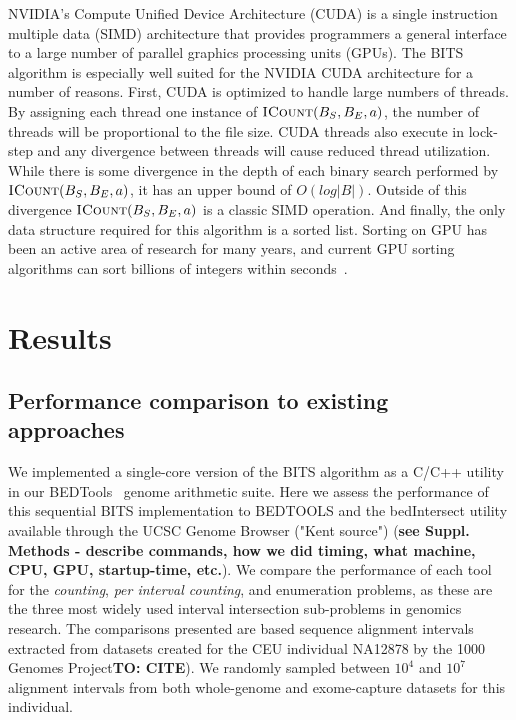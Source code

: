 \documentclass{bioinfo}
\begin{document}
	NVIDIA's Compute Unified Device Architecture (CUDA) is a single instruction
	multiple data (SIMD) architecture that provides programmers a general interface
	to a large number of parallel graphics processing units (GPUs).  The BITS
	algorithm is especially well suited for the NVIDIA CUDA architecture for a
	number of reasons.  First, CUDA is optimized to handle large numbers of
	threads.  By assigning each thread one instance of
	$\textsc{ICount}(B_S,B_E,a)$, the number of threads will be proportional to
	the file size.  CUDA threads also execute in lock-step and any divergence
	between threads will cause reduced thread utilization.  While there is some
	divergence in the depth of each binary search performed by
	$\textsc{ICount}(B_S,B_E,a)$, it has an upper bound of $O(log |B|)$.  Outside
	of this divergence $\textsc{ICount}(B_S,B_E,a)$ is a classic SIMD operation.
	And finally, the only data structure required for this algorithm is a sorted
	list.  Sorting on GPU has been an active area of research for many years, and
	current GPU sorting algorithms can sort billions of integers within
	seconds~\cite{merrill2011}.
	
	

	\section{Results}
	
	\subsection{Performance comparison to existing approaches}
	We implemented a single-core version of the BITS algorithm as a C/C++ utility 
	in our BEDTools~\citep{quinlan2010} genome arithmetic suite.
	Here we assess the performance of this sequential BITS implementation to BEDTOOLS and 
	the bedIntersect utility available through the UCSC Genome Browser ("Kent source") \citep{kent2002} 
	(\textbf{see Suppl. Methods - describe commands, how we did timing, what machine, CPU, GPU, startup-time, etc.}).
	We compare the performance of each tool for the \emph{counting}, \emph{per interval counting}, 
	and enumeration problems, as these are the three most widely used interval intersection sub-problems in genomics research. 
	The comparisons presented are based sequence alignment intervals extracted from datasets created 
	for the CEU individual NA12878 by the 1000 Genomes Project\textbf{TO: CITE}).  We randomly sampled 
	between $10^4$ and $10^7$ alignment intervals from both whole-genome and exome-capture datasets for this individual.
	
\end{document}
